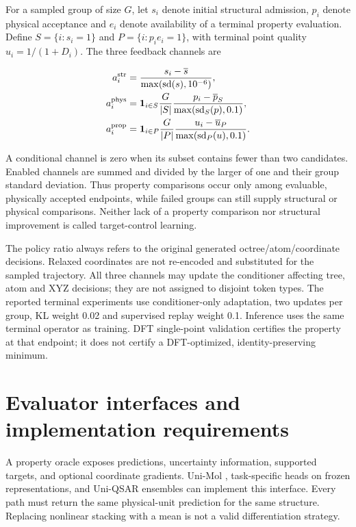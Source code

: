 \documentclass[11pt,a4paper]{article}
\begin{document}
For a sampled group of size \(G\), let \(s_i\) denote initial structural
admission, \(p_i\) denote physical acceptance and \(e_i\) denote
availability of a terminal property evaluation. Define \(S=\{i:s_i=1\}\)
and \(P=\{i:p_i e_i=1\}\), with terminal point quality
\(u_i=1/(1+D_i)\). The three feedback channels are

\[
\begin{aligned}
a_i^{\rm str}&=\frac{s_i-\overline{s}}{\max({\rm sd}(s),10^{-6})},\\
a_i^{\rm phys}&=\mathbf1_{i\in S}\frac{G}{|S|}
\frac{p_i-\overline{p}_S}{\max({\rm sd}_S(p),0.1)},\\
a_i^{\rm prop}&=\mathbf1_{i\in P}\frac{G}{|P|}
\frac{u_i-\overline{u}_P}{\max({\rm sd}_P(u),0.1)}.
\end{aligned}
\]

A conditional channel is zero when its subset contains fewer than two
candidates. Enabled channels are summed and divided by the larger of one
and their group standard deviation. Thus property comparisons occur only
among evaluable, physically accepted endpoints, while failed groups can
still supply structural or physical comparisons. Neither lack of a
property comparison nor structural improvement is called target-control
learning.

The policy ratio always refers to the original generated
octree/atom/coordinate decisions. Relaxed coordinates are not re-encoded
and substituted for the sampled trajectory. All three channels may
update the conditioner affecting tree, atom and XYZ decisions; they are
not assigned to disjoint token types. The reported terminal experiments
use conditioner-only adaptation, two updates per group, KL weight 0.02
and supervised replay weight 0.1. Inference uses the same terminal
operator as training. DFT single-point validation certifies the property
at that endpoint; it does not certify a DFT-optimized,
identity-preserving minimum.

\section{Evaluator interfaces and implementation
requirements}\label{evaluator-interfaces-and-implementation-requirements}

A property oracle exposes predictions, uncertainty information,
supported targets, and optional coordinate gradients. Uni-Mol
\citep{zhou2023unimol}, task-specific heads on frozen representations,
and Uni-QSAR ensembles can implement this interface. Every path must
return the same physical-unit prediction for the same structure.
Replacing nonlinear stacking with a mean is not a valid differentiation
strategy.
\end{document}
